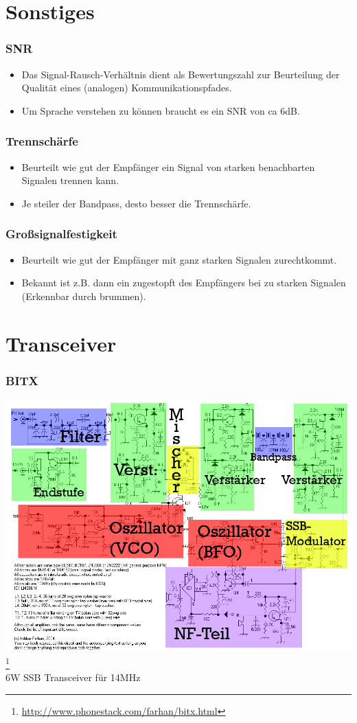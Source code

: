 \section*{Sonstiges}
\begin{frame}
    \frametitle{SNR}
    \begin{itemize}
		\item Das Signal-Rausch-Verhältnis dient als Bewertungszahl zur Beurteilung der Qualität eines (analogen) Kommunikationspfades.
		\item Um Sprache verstehen zu können braucht es ein SNR von ca 6dB.
    \end{itemize}
\end{frame}

\begin{frame}
    \frametitle{Trennschärfe}
    \begin{itemize}
		\item Beurteilt wie gut der Empfänger ein Signal von starken benachbarten Signalen trennen kann.
		\item Je steiler der Bandpass, desto besser die Trennschärfe.
    \end{itemize}
\end{frame}

\begin{frame}
    \frametitle{Großsignalfestigkeit}
    \begin{itemize}
		\item Beurteilt wie gut der Empfänger mit ganz starken Signalen zurechtkommt.
		\item Bekannt ist z.B. dann ein zugestopft des Empfängers bei zu starken Signalen (Erkennbar durch brummen).
    \end{itemize}
\end{frame}

\section*{Transceiver}

\begin{frame}
    \frametitle{BITX}
        \includegraphics[width=.95\textwidth,height=.75\textheight,keepaspectratio]{e15/bitx-farbe.png}
        \footnote{\tiny \url{http://www.phonestack.com/farhan/bitx.html}}\\
	6W SSB Transceiver für 14MHz
\end{frame}

